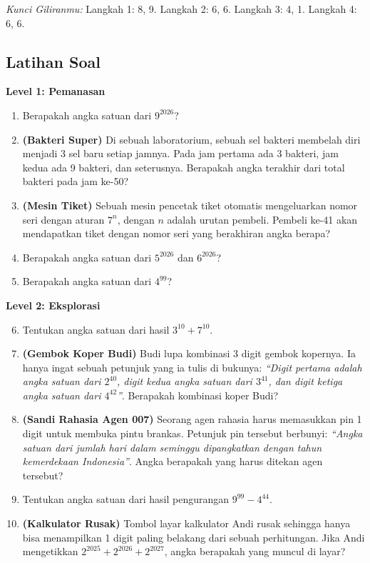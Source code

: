\documentclass[11pt,a4paper]{article}
\newcommand{\level}[1]{\par\medskip\noindent\colorbox{black!12}{\strut\textbf{#1}}\par\smallskip}
\begin{document}
\textit{Kunci Giliranmu:} Langkah 1: 8, 9. \quad Langkah 2: 6, 6. \quad Langkah 3: 4, 1. \quad
Langkah 4: 6, 6.

\newpage
\subsection*{Latihan Soal}

\level{Level 1: Pemanasan}
\begin{enumerate}
    \item Berapakah angka satuan dari $9^{2026}$?
    \item \textbf{(Bakteri Super)} Di sebuah laboratorium, sebuah sel bakteri membelah diri
          menjadi 3 sel baru setiap jamnya. Pada jam pertama ada 3 bakteri, jam kedua ada
          9 bakteri, dan seterusnya. Berapakah angka terakhir dari total bakteri pada jam ke-50?
    \item \textbf{(Mesin Tiket)} Sebuah mesin pencetak tiket otomatis mengeluarkan nomor seri
          dengan aturan $7^n$, dengan $n$ adalah urutan pembeli. Pembeli ke-41 akan mendapatkan
          tiket dengan nomor seri yang berakhiran angka berapa?
    \item Berapakah angka satuan dari $5^{2026}$ dan $6^{2026}$?
    \item Berapakah angka satuan dari $4^{99}$?
\end{enumerate}

\level{Level 2: Eksplorasi}
\begin{enumerate}
    \setcounter{enumi}{5}
    \item Tentukan angka satuan dari hasil $3^{10} + 7^{10}$.
    \item \textbf{(Gembok Koper Budi)} Budi lupa kombinasi 3 digit gembok kopernya. Ia hanya
          ingat sebuah petunjuk yang ia tulis di bukunya: \textit{``Digit pertama adalah angka
          satuan dari $2^{40}$, digit kedua angka satuan dari $3^{41}$, dan digit ketiga angka
          satuan dari $4^{42}$''}. Berapakah kombinasi koper Budi?
    \item \textbf{(Sandi Rahasia Agen 007)} Seorang agen rahasia harus memasukkan pin 1 digit
          untuk membuka pintu brankas. Petunjuk pin tersebut berbunyi: \textit{``Angka satuan dari
          jumlah hari dalam seminggu dipangkatkan dengan tahun kemerdekaan Indonesia''}.
          Angka berapakah yang harus ditekan agen tersebut?
    \item Tentukan angka satuan dari hasil pengurangan $9^{99} - 4^{44}$.
    \item \textbf{(Kalkulator Rusak)} Tombol layar kalkulator Andi rusak sehingga hanya bisa
          menampilkan 1 digit paling belakang dari sebuah perhitungan. Jika Andi mengetikkan
          $2^{2025} + 2^{2026} + 2^{2027}$, angka berapakah yang muncul di layar?
\end{enumerate}
\end{document}
